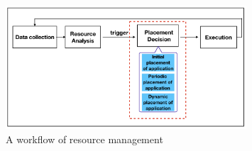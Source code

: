



\begin{figure}
	\centering
	\includegraphics[width=0.8\textwidth]{pics/workflow_management.png}
	\caption{A workflow of resource management \cite{Mishra:2012kx}}
	\label{fig:workflow}
\end{figure}




